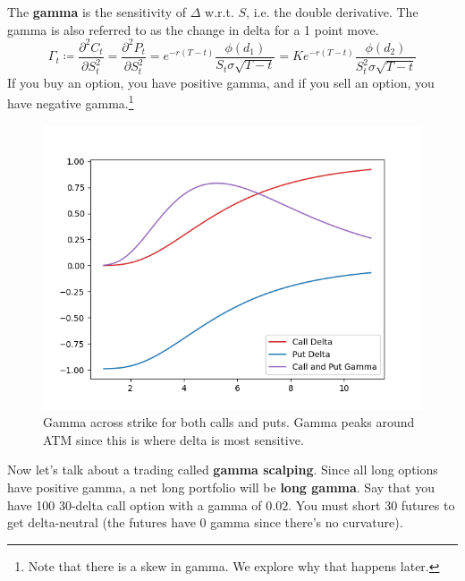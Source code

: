 \documentclass{article}
\begin{document}
    \begin{definition}[Gamma]
      The \textbf{gamma} is the sensitivity of $\Delta$ w.r.t. $S$, i.e. the double derivative. The gamma is also referred to as the change in delta for a 1 point move. 
      \begin{equation}
        \Gamma_t \coloneqq \frac{\partial^2 C_t }{\partial S_t^2} = \frac{\partial^2 P_t}{\partial S_t^2} = e^{-r(T - t)} \frac{\phi(d_1)}{S_t \sigma \sqrt{T - t}} = K e^{-r(T - t)} \frac{\phi(d_2)}{S_t^2 \sigma \sqrt{T - t}}
      \end{equation}
      If you buy an option, you have positive gamma, and if you sell an option, you have negative gamma.\footnote{Note that there is a skew in gamma. We explore why that happens later. }
      \begin{figure}[H]
        \centering 
        \includegraphics[scale=0.45]{img/gamma.png}
        \caption{Gamma across strike for both calls and puts. Gamma peaks around ATM since this is where delta is most sensitive. }
        \label{fig:gamma_across_strike}
      \end{figure}
    \end{definition}

    Now let's talk about a trading called \textbf{gamma scalping}. Since all long options have positive gamma, a net long portfolio will be \textbf{long gamma}. Say that you have 100 $30$-delta call option with a gamma of $0.02$. You must short $30$ futures to get delta-neutral (the futures have $0$ gamma since there's no curvature).
\end{document}
